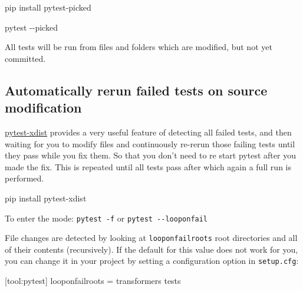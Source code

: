 \documentclass[
]{report}
\newenvironment{Shaded}{\begin{snugshade}}{\end{snugshade}}
\newcommand{\AttributeTok}[1]{\textcolor[rgb]{0.40,0.45,0.13}{#1}}
\newcommand{\DataTypeTok}[1]{\textcolor[rgb]{0.68,0.00,0.00}{#1}}
\newcommand{\ExtensionTok}[1]{\textcolor[rgb]{0.00,0.23,0.31}{#1}}
\newcommand{\KeywordTok}[1]{\textcolor[rgb]{0.00,0.23,0.31}{#1}}
\newcommand{\NormalTok}[1]{\textcolor[rgb]{0.00,0.23,0.31}{#1}}
\newcommand{\OtherTok}[1]{\textcolor[rgb]{0.00,0.23,0.31}{#1}}
\newcommand{\StringTok}[1]{\textcolor[rgb]{0.13,0.47,0.30}{#1}}
\begin{document}
\begin{Shaded}
\begin{Highlighting}[]
\ExtensionTok{pip}\NormalTok{ install pytest{-}picked}
\end{Highlighting}
\end{Shaded}

\begin{Shaded}
\begin{Highlighting}[]
\ExtensionTok{pytest} \AttributeTok{{-}{-}picked}
\end{Highlighting}
\end{Shaded}

All tests will be run from files and folders which are modified, but not
yet committed.

\subsection{Automatically rerun failed tests on source
modification}\label{automatically-rerun-failed-tests-on-source-modification}

\href{https://github.com/pytest-dev/pytest-xdist}{pytest-xdist} provides
a very useful feature of detecting all failed tests, and then waiting
for you to modify files and continuously re-rerun those failing tests
until they pass while you fix them. So that you don't need to re start
pytest after you made the fix. This is repeated until all tests pass
after which again a full run is performed.

\begin{Shaded}
\begin{Highlighting}[]
\ExtensionTok{pip}\NormalTok{ install pytest{-}xdist}
\end{Highlighting}
\end{Shaded}

To enter the mode: \texttt{pytest\ -f} or
\texttt{pytest\ -\/-looponfail}

File changes are detected by looking at \texttt{looponfailroots} root
directories and all of their contents (recursively). If the default for
this value does not work for you, you can change it in your project by
setting a configuration option in \texttt{setup.cfg}:

\begin{Shaded}
\begin{Highlighting}[]
\KeywordTok{[tool:pytest]}
\DataTypeTok{looponfailroots }\OtherTok{=}\StringTok{ transformers tests}
\end{Highlighting}
\end{Shaded}
\end{document}
